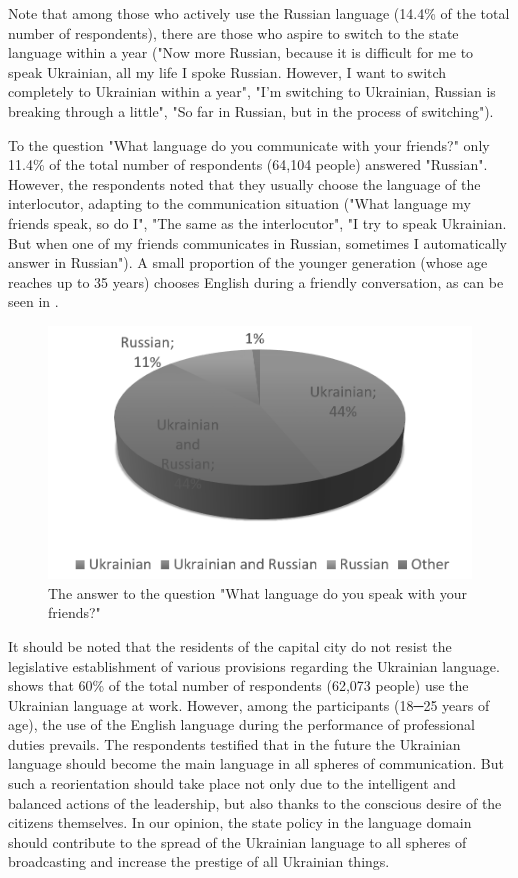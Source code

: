 \documentclass[english]{textolivre}
\begin{document}
Note that among those who actively use the Russian language (14.4\% of the total number of respondents), there are those who aspire to switch to the state language within a year ("Now more Russian, because it is difficult for me to speak Ukrainian, all my life I spoke Russian. However, I want to switch completely to Ukrainian within a year", "I'm switching to Ukrainian, Russian is breaking through a little", "So far in Russian, but in the process of switching").

To the question "What language do you communicate with your friends?" only 11.4\% of the total number of respondents (64,104 people) answered "Russian". However, the respondents noted that they usually choose the language of the interlocutor, adapting to the communication situation ("What language my friends speak, so do I", "The same as the interlocutor", "I try to speak Ukrainian. But when one of my friends communicates in Russian, sometimes I automatically answer in Russian"). A small proportion of the younger generation (whose age reaches up to 35 years) chooses English during a friendly conversation, as can be seen in .

\begin{figure}[h!]
\centering
\begin{minipage}{.6\textwidth}
 \includegraphics[width=\textwidth]{Fig4.png}
 \caption{The answer to the question "What language do you speak with your friends?"}
 \label{fig4}
\end{minipage}
\end{figure}

It should be noted that the residents of the capital city do not resist the legislative establishment of various provisions regarding the Ukrainian language.  shows that 60\% of the total number of respondents (62,073 people) use the Ukrainian language at work. However, among the participants (18─25 years of age), the use of the English language during the performance of professional duties prevails. The respondents testified that in the future the Ukrainian language should become the main language in all spheres of communication. But such a reorientation should take place not only due to the intelligent and balanced actions of the leadership, but also thanks to the conscious desire of the citizens themselves. In our opinion, the state policy in the language domain should contribute to the spread of the Ukrainian language to all spheres of broadcasting and increase the prestige of all Ukrainian things.
\end{document}
